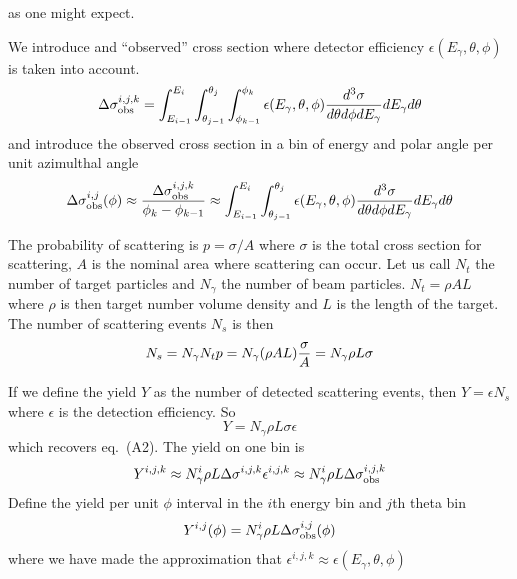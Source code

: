 \documentclass{article}
\begin{document}
as one might expect.

We introduce and ``observed'' cross section where detector efficiency $\epsilon(E_\gamma,\theta,\phi)$ is taken into account.
\begin{equation}
\Delta\sigma^{i,j,k}_{\rm obs} = \int^{E_i}_{E_{i-1}}\int_{\theta_{j-1}}^{\theta_j}\int^{\phi_k}_{\phi_{k-1}} \epsilon(E_\gamma,\theta,\phi) {d^3\sigma \over d\theta d\phi dE_\gamma} dE_\gamma d\theta
\end{equation}
and introduce the observed cross section in a bin of energy and polar angle per unit azimulthal angle
\begin{equation}
\Delta\sigma^{i,j}_{\rm obs}(\phi) \approx {\Delta\sigma^{i,j,k}_{\rm obs} \over \phi_k - \phi_{k-1}} \approx \int^{E_i}_{E_{i-1}}\int_{\theta_{j-1}}^{\theta_j} \epsilon(E_\gamma,\theta,\phi) {d^3\sigma \over d\theta d\phi dE_\gamma} dE_\gamma d\theta\end{equation}

The probability of scattering is $p = \sigma/A$ where $\sigma$ is the total cross section for scattering, $A$ is the nominal area where scattering can occur. Let us call $N_t$ the number of target particles and $N_\gamma$ the number of beam particles. $N_t = \rho AL$ where $\rho$ is then target number volume density and $L$ is the length of the target. The number of scattering events $N_s$ is then
\begin{equation}
N_s = N_\gamma N_t p = N_\gamma(\rho A L){\sigma\over A} = N_\gamma\rho L\sigma
\end{equation}

If we define the yield $Y$ as the number of detected scattering events, then $Y = \epsilon N_s$ where $\epsilon$ is the detection efficiency. So
\begin{equation}
Y = N_\gamma\rho L\sigma\epsilon
\end{equation}
which recovers eq.~(A2). The yield on one bin is
\begin{equation}
Y^{i,j,k} \approx N^i_\gamma\rho L\Delta\sigma^{i,j,k}\epsilon^{i,j,k} \\
\approx N^i_\gamma\rho L\Delta\sigma^{i,j,k}_{\rm obs}
\end{equation}
Define the yield per unit $\phi$ interval in the $i$th energy bin and $j$th theta bin
\begin{equation}
Y^{i,j}(\phi) = N^i_\gamma\rho L\Delta\sigma^{i,j}_{\rm obs}(\phi)
\end{equation}
where we have made the approximation that $\epsilon^{i,j,k} \approx \epsilon(E_\gamma,\theta,\phi)$
\end{document}
